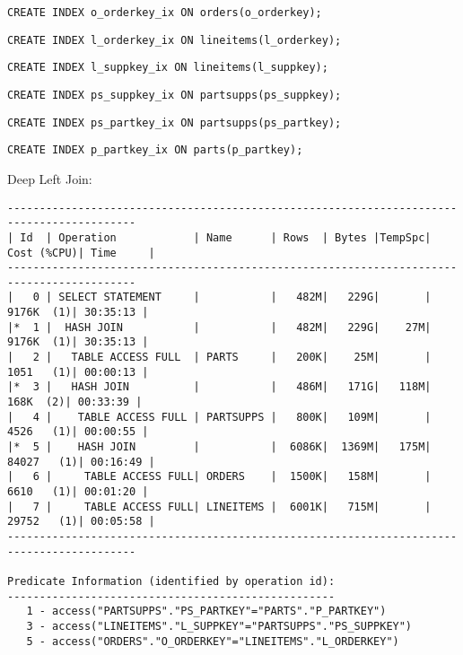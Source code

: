 \documentclass[10pt]{article}
\begin{document}
\begin{lstlisting}[style=sql]
CREATE INDEX o_orderkey_ix ON orders(o_orderkey);
\end{lstlisting}
\begin{lstlisting}[style=sql]
CREATE INDEX l_orderkey_ix ON lineitems(l_orderkey);
\end{lstlisting}
\begin{lstlisting}[style=sql]
CREATE INDEX l_suppkey_ix ON lineitems(l_suppkey);
\end{lstlisting}
\begin{lstlisting}[style=sql]
CREATE INDEX ps_suppkey_ix ON partsupps(ps_suppkey);
\end{lstlisting}
\begin{lstlisting}[style=sql]
CREATE INDEX ps_partkey_ix ON partsupps(ps_partkey);
\end{lstlisting}
\begin{lstlisting}[style=sql]
CREATE INDEX p_partkey_ix ON parts(p_partkey);
\end{lstlisting}
Deep Left Join:
\begin{lstlisting}[style=queryexecutionplan]
------------------------------------------------------------------------------------------
| Id  | Operation            | Name      | Rows  | Bytes |TempSpc| Cost (%CPU)| Time     |
------------------------------------------------------------------------------------------
|   0 | SELECT STATEMENT     |           |   482M|   229G|       |  9176K  (1)| 30:35:13 |
|*  1 |  HASH JOIN           |           |   482M|   229G|    27M|  9176K  (1)| 30:35:13 |
|   2 |   TABLE ACCESS FULL  | PARTS     |   200K|    25M|       |  1051   (1)| 00:00:13 |
|*  3 |   HASH JOIN          |           |   486M|   171G|   118M|   168K  (2)| 00:33:39 |
|   4 |    TABLE ACCESS FULL | PARTSUPPS |   800K|   109M|       |  4526   (1)| 00:00:55 |
|*  5 |    HASH JOIN         |           |  6086K|  1369M|   175M| 84027   (1)| 00:16:49 |
|   6 |     TABLE ACCESS FULL| ORDERS    |  1500K|   158M|       |  6610   (1)| 00:01:20 |
|   7 |     TABLE ACCESS FULL| LINEITEMS |  6001K|   715M|       | 29752   (1)| 00:05:58 |
------------------------------------------------------------------------------------------
 
Predicate Information (identified by operation id):
---------------------------------------------------
   1 - access("PARTSUPPS"."PS_PARTKEY"="PARTS"."P_PARTKEY")
   3 - access("LINEITEMS"."L_SUPPKEY"="PARTSUPPS"."PS_SUPPKEY")
   5 - access("ORDERS"."O_ORDERKEY"="LINEITEMS"."L_ORDERKEY")
\end{lstlisting}
\end{document}
